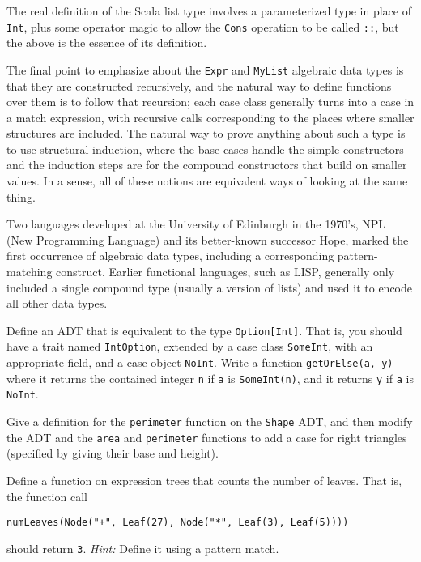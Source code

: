The real definition of the Scala list type involves a parameterized type in place of \texttt{Int}, plus some operator magic to allow the \texttt{Cons} operation to be called \texttt{::}, but the above is the essence of its definition.

The final point to emphasize about the \texttt{Expr} and \texttt{MyList} algebraic data types is that they are constructed recursively, and the natural way to define functions over them is to follow that recursion; each case class generally turns into a case in a match expression, with recursive calls corresponding to the places where smaller structures are included. The natural way to prove anything about such a type is to use structural induction, where the base cases handle the simple constructors and the induction steps are for the compound constructors that build on smaller values. In a sense, all of these notions are equivalent ways of looking at the same thing.

\begin{tailquote}
Two languages developed at the University of Edinburgh in the 1970's, NPL (New Programming Language) and its better-known successor Hope, marked the first occurrence of algebraic data types, including a corresponding pattern-matching construct. Earlier functional languages, such as LISP, generally only included a single compound type (usually a version of lists) and used it to encode all other data types.
\end{tailquote}
\begin{exercises}
\item Define an ADT that is equivalent to the type \verb|Option[Int]|. That is, you should have a trait named \verb|IntOption|, extended by a case class \verb|SomeInt|, with an appropriate field, and a case object \verb|NoInt|. Write a function \verb|getOrElse(a, y)| where it returns the contained integer \verb|n| if \verb|a| is \verb|SomeInt(n)|, and it returns \verb|y| if \verb|a| is \verb|NoInt|.

\item Give a definition for the \texttt{perimeter} function on the \texttt{Shape} ADT, and then modify the ADT and the \texttt{area} and \texttt{perimeter} functions to add a case for right triangles (specified by giving their base and height).

\item Define a function on expression trees that counts the number of leaves. That is, the function call
\begin{verbatim}
numLeaves(Node("+", Leaf(27), Node("*", Leaf(3), Leaf(5))))
\end{verbatim}
should return \texttt{3}. \textit{Hint:} Define it using a pattern match.
\end{exercises}

